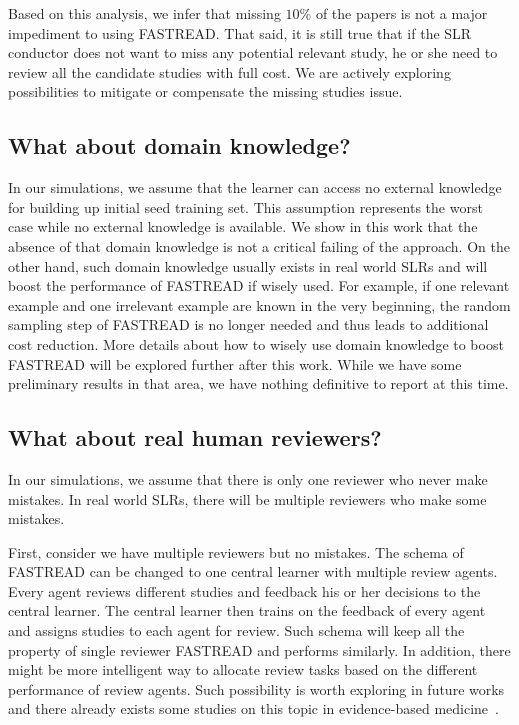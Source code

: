 \documentclass{svjour3}
\theoremstyle{break}
\begin{document}
Based on this analysis, we infer that missing  $10\%$ of the papers is not a major impediment to using FASTREAD. That said,  it is still true that if the SLR conductor does not want to miss any potential relevant study, he or she need to review all the candidate studies with full cost. We are actively exploring possibilities to mitigate or compensate the missing studies issue. 


 

\subsection{What about domain knowledge?}

In our simulations, we assume that the learner can access no external knowledge for building up initial seed training set. This assumption represents the worst case while no external knowledge is available. We show in this work that the absence of that domain knowledge is not a critical failing of the approach. On the other hand, such domain knowledge usually exists in real world SLRs and will boost the performance of FASTREAD if wisely used. For example, if one relevant example and one irrelevant example are known in the very beginning, the random sampling step of FASTREAD is no longer needed and thus leads to additional cost reduction. More details about how to wisely use domain knowledge to boost FASTREAD will be explored further after this work. While we have some preliminary results in that area, we have nothing definitive to report at this time.

\subsection{What about real human reviewers?}

In our simulations, we assume that there is only one reviewer who never make mistakes. In real world SLRs, there will be multiple reviewers who make some mistakes. 

First, consider we have multiple reviewers but no mistakes. The schema of FASTREAD can be changed to one central learner with multiple review agents. Every agent reviews different studies and feedback his or her decisions to the central learner. The central learner then trains on the feedback of every agent and assigns studies to each agent for review. Such schema will keep all the property of single reviewer FASTREAD and performs similarly. In addition, there might be more intelligent way to allocate review tasks based on the different performance of review agents. Such possibility is worth exploring in future works and there already exists some studies on this topic in evidence-based medicine~\cite{wallace2011should}.
\end{document}

